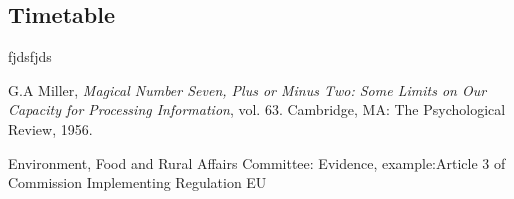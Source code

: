 \documentclass[a4paper, 11pt]{article}
\begin{document}
\subsection{Timetable}

\clearpage

\begin{thebibliography}{11}

	fjdsfjds
	
	G.A Miller, \emph{Magical Number Seven, Plus or Minus Two: Some Limits on Our Capacity for Processing Information}, vol. 63. Cambridge, MA: The Psychological Review, 1956.

Environment, Food and Rural Affairs Committee: Evidence,
example:Article 3 of Commission Implementing Regulation EU


\end{thebibliography}
\end{document}
